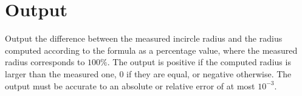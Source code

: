 \section*{Output}
Output the difference between the measured incircle radius and the radius computed according to the formula as a percentage value, where the measured radius corresponds to $100\%$.
The output is positive if the computed radius is larger than the measured one, $0$ if they are equal, or negative otherwise.
The output must be accurate to an absolute or relative error of at most $10^{-3}$.

